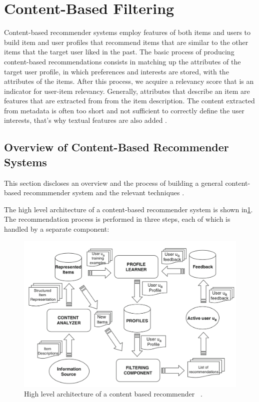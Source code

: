 
\section{Content-Based Filtering}\label{section:content_based_filtering}

Content-based recommender systems employ features of both items and users to build item and user profiles that recommend  items that are similar to the other items that the target user liked in the past. The basic process of producing content-based recommendations consists in matching up the attributes of the target user profile, in which preferences and interests are stored, with the attributes of the items. After this process, we acquire a relevancy score that is an indicator for user-item relevancy. Generally, attributes that describe an item are features that are extracted from from the item description. The content extracted from metadata is often too short and not sufficient to correctly define the user interests, that's why textual features are also added \cite{de2015semantics}.

\subsection{Overview of Content-Based Recommender Systems}

This section discloses an overview and the process of building a general content-based recommmender system and the relevant techniques \cite{de2015semantics}.

The high level architecture of a content-based recommender system is shown in\ref{fig:high-level-content-based}. The recommendation process is performed in three steps, each of which is handled by a separate component:

 \begin{figure}[!ht]
	\centering
	\includegraphics[width=\textwidth]{figures/HighLevelContentBased.png}
	\caption{High level architecture of a content based recommender  ~\parencite{de2015semantics}.}
	\label{fig:high-level-content-based}
\end{figure}



